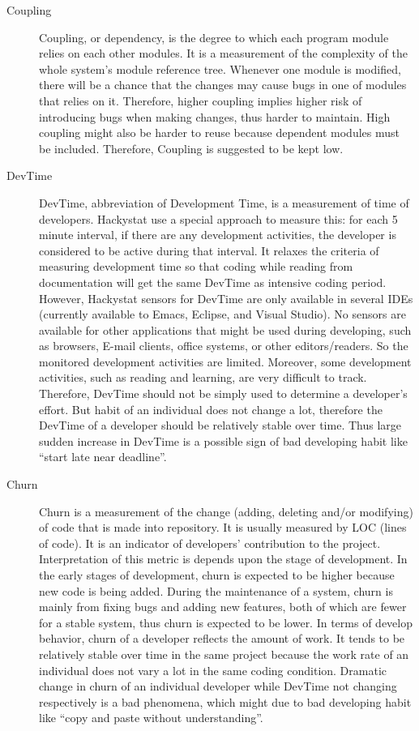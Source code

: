 \begin{description}
\item[Coupling] 
Coupling, or dependency, is the degree to which each program module relies on each other modules. It is a measurement of the complexity of the whole system's module reference tree. Whenever one module is modified, there will be a chance that the changes may cause bugs in one of modules that relies on it. Therefore, higher coupling implies higher risk of introducing bugs when making changes, thus harder to maintain. High coupling might also be harder to reuse because dependent modules must be included. Therefore, Coupling is suggested to be kept low.

\item[DevTime] 
DevTime, abbreviation of Development Time, is a measurement of time of developers. Hackystat use a special approach to measure this: for each 5 minute interval, if there are any development activities, the developer is considered to be active during that interval. It relaxes the criteria of measuring development time so that coding while reading from documentation will get the same DevTime as intensive coding period. However, Hackystat sensors for DevTime are only available in several IDEs (currently available to Emacs, Eclipse, and Visual Studio). No sensors are available for other applications that might be used during developing, such as browsers, E-mail clients, office systems, or other editors/readers. So the monitored development activities are limited. Moreover, some development activities, such as reading and learning, are very difficult to track. Therefore, DevTime should not be simply used to determine a developer's effort. But habit of an individual does not change a lot, therefore the DevTime of a developer should be relatively stable over time. Thus large sudden increase in DevTime is a possible sign of bad developing habit like ``start late near deadline''.

\item[Churn] 
Churn is a measurement of the change (adding, deleting and/or modifying) of code that is made into repository. It is usually measured by LOC (lines of code). It is an indicator of developers' contribution to the project. Interpretation of this metric is depends upon the stage of development. In the early stages of development, churn is expected to be higher because new code is being added. During the maintenance of a system, churn is mainly from fixing bugs and adding new features, both of which are fewer for a stable system, thus churn is expected to be lower. In terms of develop behavior, churn of a developer reflects the amount of work. It tends to be relatively stable over time in the same project because the work rate of an individual does not vary a lot in the same coding condition. Dramatic change in churn of an individual developer while DevTime not changing respectively is a bad phenomena, which might due to bad developing habit like ``copy and paste without understanding''.


\end{description}
